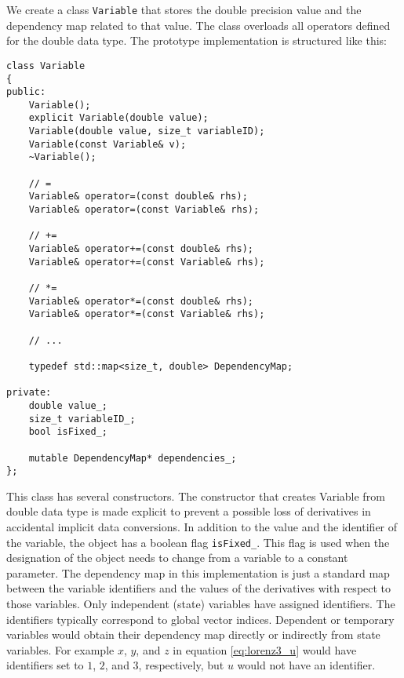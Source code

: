 \documentclass[10pt]{ijnam}
\theoremstyle{definition}
\begin{document}
We create a class \texttt{Variable} that stores the double precision value and the dependency map 
related to that value. The class overloads all operators defined for the double 
data type. The prototype implementation is structured like this:
\begin{lstlisting}
class Variable
{
public:
    Variable();
    explicit Variable(double value);
    Variable(double value, size_t variableID);
    Variable(const Variable& v);
    ~Variable();
    
    // =
    Variable& operator=(const double& rhs);
    Variable& operator=(const Variable& rhs);
    
    // +=
    Variable& operator+=(const double& rhs);
    Variable& operator+=(const Variable& rhs);
    
    // *=
    Variable& operator*=(const double& rhs);
    Variable& operator*=(const Variable& rhs);
    
    // ...
    
    typedef std::map<size_t, double> DependencyMap;    
    
private:
    double value_;
    size_t variableID_;
    bool isFixed_;
    
    mutable DependencyMap* dependencies_;    
};
\end{lstlisting}
This class has several constructors. The constructor that creates Variable from double 
data type is made explicit to prevent a possible loss of derivatives in 
accidental implicit data conversions. In addition to the value and the
identifier of the variable, the object has a boolean flag \verb|isFixed_|. This flag is used when the
designation of the object needs to change from a variable to a constant parameter. 
The dependency map in this implementation is just a standard map between the variable 
identifiers and the values of the derivatives with respect to those variables. Only independent
(state) variables have assigned identifiers. The identifiers typically correspond to global vector 
indices. Dependent or temporary variables 
would obtain their dependency map directly or indirectly from state variables. For 
example $x$, $y$, and $z$ in equation \eqref{eq:lorenz3_u} would have identifiers set to $1$, $2$, and $3$, respectively, but $u$ would not have an identifier.
\end{document}
